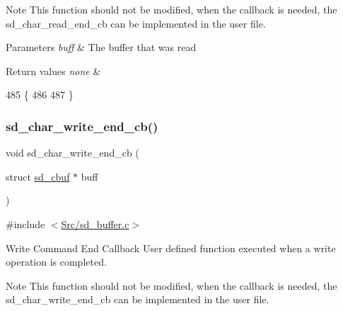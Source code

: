 \begin{DoxyNote}{Note}
This function should not be modified, when the callback is needed, the sd\+\_\+char\+\_\+read\+\_\+end\+\_\+cb can be implemented in the user file.
\end{DoxyNote}

\begin{DoxyParams}{Parameters}
{\em buff} & The buffer that was read \\
\hline
\end{DoxyParams}

\begin{DoxyRetVals}{Return values}
{\em none} & \\
\hline
\end{DoxyRetVals}

\begin{DoxyCode}
485 \{
486 
487 \}
\end{DoxyCode}
\mbox{\label{group___s_d___buffer___functions_ga62eae3c0c1cbe53dbb549106668fa24c}} 
\subsubsection{\texorpdfstring{sd\+\_\+char\+\_\+write\+\_\+end\+\_\+cb()}{sd\_char\_write\_end\_cb()}}
{\footnotesize\ttfamily void sd\+\_\+char\+\_\+write\+\_\+end\+\_\+cb (\begin{DoxyParamCaption}\item[{struct \mbox{\hyperlink{structsd__cbuf}{sd\+\_\+cbuf}} $\ast$}]{buff }\end{DoxyParamCaption})}



{\ttfamily \#include $<$\mbox{\hyperlink{sd__buffer_8c}{Src/sd\+\_\+buffer.\+c}}$>$}



Write Command End Callback User defined function executed when a write operation is completed. 

\begin{DoxyNote}{Note}
This function should not be modified, when the callback is needed, the sd\+\_\+char\+\_\+write\+\_\+end\+\_\+cb can be implemented in the user file.
\end{DoxyNote}

